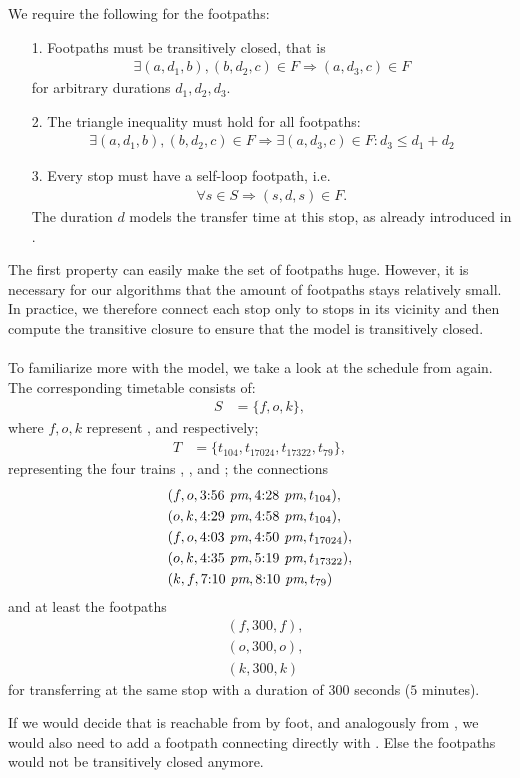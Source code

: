 	We require the following for the footpaths:
	\begin{itemize}
		\item[1.] Footpaths must be transitively closed, that is
			\begin{align*}
				\exists (a, d_1, b), (b, d_2, c) \in F \Rightarrow (a, d_3, c) \in F
			\end{align*}
			for arbitrary durations $d_1, d_2, d_3$.
		\item[2.] The triangle inequality must hold for all footpaths:
			\begin{align*}
				\exists (a, d_1, b), (b, d_2, c) \in F \Rightarrow \exists (a, d_3, c) \in F: d_3 \le d_1 + d_2
			\end{align*}
		\item[3.] Every stop must have a self-loop footpath, i.e.
			\begin{align*}
				\forall s \in S \Rightarrow (s, d, s) \in F.
			\end{align*}
			The duration $d$ models the transfer time at this stop, as already
			introduced in .
	\end{itemize}
	The first property can easily make the set of footpaths huge. However, it is necessary for our algorithms that the
	amount of footpaths stays relatively small. In practice, we therefore connect each stop only to stops in its vicinity
	and then compute the transitive closure to ensure that the model is transitively closed.\\\\
	To familiarize more with the model, we take a look at the schedule from  again.
	The corresponding timetable consists of:
	\begin{align*}
		S	&= \{f, o, k\},
	\end{align*}
	where $f, o, k$ represent \freiburg, \offenburg and \karlsruhe respectively;
	\begin{align*}
		T	&= \{t_{104}, t_{17024}, t_{17322}, t_{79}\},
	\end{align*}
	representing the four trains \ticef, \tregiof, \tregios and \tices; the connections
	\begin{align*}
		&(f, o, 3\text{:}56\textit{ pm}, 4\text{:}28\textit{ pm}, t_{104}),\\
		&(o, k, 4\text{:}29\textit{ pm}, 4\text{:}58\textit{ pm}, t_{104}),\\
		&(f, o, 4\text{:}03\textit{ pm}, 4\text{:}50\textit{ pm}, t_{17024}),\\
		&(o, k, 4\text{:}35\textit{ pm}, 5\text{:}19\textit{ pm}, t_{17322}),\\
		&(k, f, 7\text{:}10\textit{ pm}, 8\text{:}10\textit{ pm}, t_{79})
	\end{align*}
	and at least the footpaths
	\begin{align*}
		&(f, 300, f),\\
		&(o, 300, o),\\
		&(k, 300, k)
	\end{align*}
	for transferring at the same stop with a duration of $300$ seconds ($5$ minutes).
	
	If we would decide that \offenburg is reachable from \freiburg by foot, and analogously \karlsruhe from
	\offenburg, we would also need to add a footpath connecting \freiburg directly with \karlsruhe.
	Else the footpaths would not be transitively closed anymore.
